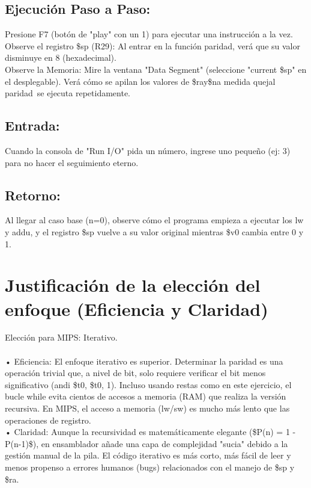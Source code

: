 \documentclass{article}
\begin{document}
\subsection{Ejecución Paso a Paso:}
Presione F7 (botón de "play" con un 1) para ejecutar una instrucción a la vez.
\\
Observe el registro \$sp (R29): Al entrar en la función paridad, verá que su valor disminuye en 8 (hexadecimal).
\\
Observe la Memoria: Mire la ventana "Data Segment" (seleccione "current \$sp" en el desplegable). Verá cómo se apilan los valores de \$ray\$na medida quejal paridad\ se ejecuta repetidamente.
\subsection{Entrada:}
Cuando la consola de "Run I/O" pida un número, ingrese uno pequeño (ej: 3) para no hacer el seguimiento eterno.
\subsection{Retorno:}
Al llegar al caso base (n=0), observe cómo el programa empieza a ejecutar los lw y addu, y el registro \$sp vuelve a su valor original mientras \$v0 cambia entre 0 y 1.

\section{Justificación de la elección del enfoque (Eficiencia y Claridad)}
Elección para MIPS: Iterativo.
\\
\\
•	Eficiencia: El enfoque iterativo es superior. Determinar la paridad es una operación trivial que, a nivel de bit, solo requiere verificar el bit menos significativo (andi \$t0, \$t0, 1). Incluso usando restas como en este ejercicio, el bucle while evita cientos de accesos a memoria (RAM) que realiza la versión recursiva. En MIPS, el acceso a memoria (lw/sw) es mucho más lento que las operaciones de registro.
\\
•	Claridad: Aunque la recursividad es matemáticamente elegante (\$P(n) = 1 - P(n-1)\$), en ensamblador añade una capa de complejidad "sucia" debido a la gestión manual de la pila. El código iterativo es más corto, más fácil de leer y menos propenso a errores humanos (bugs) relacionados con el manejo de \$sp y \$ra.
\end{document}
